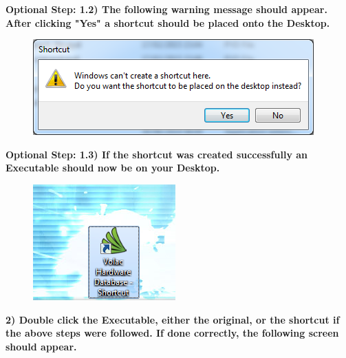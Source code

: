 \textbf{Optional Step: 1.2) The following warning message should appear. After clicking "Yes" a shortcut should be placed onto the Desktop.}

\begin{figure}[H]
    \includegraphics[width=\textwidth]{./Manual/Images/run3.png}
\end{figure}
\newpage

\textbf{Optional Step: 1.3) If the shortcut was created successfully an Executable should now be on your Desktop.}

\begin{figure}[H]
    \includegraphics[width=\textwidth]{./Manual/Images/run4.png}
\end{figure}
\newpage

\textbf{2) Double click the Executable, either the original, or the shortcut if the above steps were followed.  If done correctly, the following screen should appear.}

